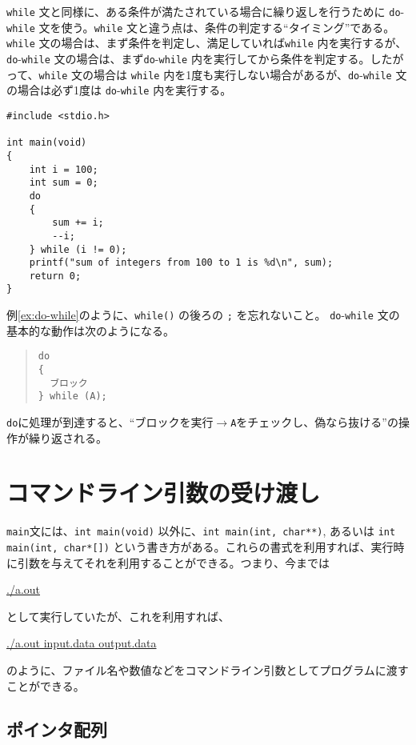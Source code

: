 \texttt{while} 文と同様に、ある条件が満たされている場合に繰り返しを行うために \texttt{do}-\texttt{while} 文を使う。\texttt{while} 文と違う点は、条件の判定する``タイミング''である。\texttt{while} 文の場合は、まず条件を判定し、満足していれば\texttt{while} 内を実行するが、\texttt{do}-\texttt{while} 文の場合は、まず\texttt{do}-\texttt{while} 内を実行してから条件を判定する。したがって、\texttt{while} 文の場合は \texttt{while} 内を1度も実行しない場合があるが、\texttt{do}-\texttt{while} 文の場合は必ず1度は \texttt{do}-\texttt{while} 内を実行する。
\begin{reidai}\label{ex:do-while}
    \begin{verbatim}
#include <stdio.h>

int main(void)
{
    int i = 100;
    int sum = 0;
    do
    {
        sum += i;
        --i;
    } while (i != 0);
    printf("sum of integers from 100 to 1 is %d\n", sum);
    return 0;
}
\end{verbatim}
\end{reidai} \noindent
例\ref{ex:do-while}のように、\texttt{while()} の後ろの \texttt{;} を忘れないこと。
\texttt{do}-\texttt{while} 文の基本的な動作は次のようになる。
\begin{quote}
    \begin{verbatim}
do
{
  ブロック
} while (A);
\end{verbatim}
\end{quote}
\texttt{do}に処理が到達すると、``ブロックを実行\(\rightarrow\)\texttt{A}をチェックし、偽なら抜ける''の操作が繰り返される。

\section{コマンドライン引数の受け渡し}
\texttt{main}文には、\texttt{int main(void)} 以外に、\texttt{int main(int, char**)}, あるいは \texttt{int main(int, char*[])} という書き方がある。これらの書式を利用すれば、実行時に引数を与えてそれを利用することができる。つまり、今までは
\begin{commandline2}
    \prompt \underline{./a.out}
\end{commandline2} \noindent
として実行していたが、これを利用すれば、
\begin{commandline2}
    \prompt \underline{./a.out input.data output.data}
\end{commandline2} \noindent
のように、ファイル名や数値などをコマンドライン引数としてプログラムに渡すことができる。

\subsection{ポインタ配列}

